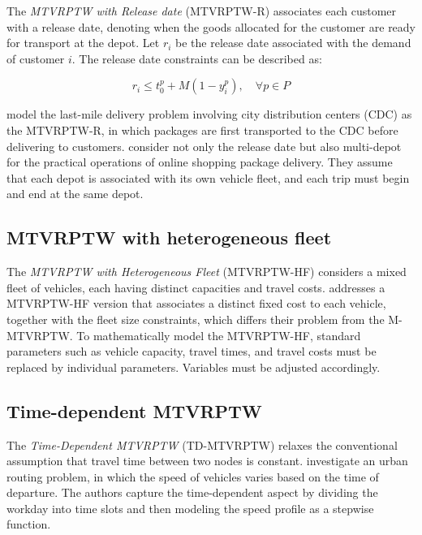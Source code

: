 \documentclass[11pt]{article}
\begin{document}
The \textit{MTVRPTW with Release date} (MTVRPTW-R) associates each customer with a release date, denoting when the goods allocated for the customer are ready for transport at the depot.  Let $r_i$ be the release date associated with the demand of customer $i$.  The release date constraints can be described as:

\begin{equation} \label{eq25}
    r_i \leq t^p_0 + M(1 - y^p_i), \quad \forall p \in P
\end{equation}

\cite{cattaruzza2016multi} model the last-mile delivery problem involving city distribution centers (CDC) as the MTVRPTW-R, in which packages are first transported to the CDC before delivering to customers.  \cite{zhen2020multi} consider not only the release date but also multi-depot for the practical operations of online shopping package delivery.  They assume that each depot is associated with its own vehicle fleet, and each trip must begin and end at the same depot.

\subsection{MTVRPTW with heterogeneous fleet}

The \textit{MTVRPTW with Heterogeneous Fleet} (MTVRPTW-HF) considers a mixed fleet of vehicles, each having distinct capacities and travel costs.  \cite{despaux2016multi} addresses a MTVRPTW-HF version that associates a distinct fixed cost to each vehicle, together with the fleet size constraints, which differs their problem from the M-MTVRPTW.  To mathematically model the MTVRPTW-HF, standard parameters such as vehicle capacity, travel times, and travel costs must be replaced by individual parameters.  Variables must be adjusted accordingly.

\subsection{Time-dependent MTVRPTW}

The \textit{Time-Dependent MTVRPTW} (TD-MTVRPTW) relaxes the conventional assumption that travel time between two nodes is constant.  \cite{pan2021multi} investigate an urban routing problem, in which the speed of vehicles varies based on the time of departure.  The authors capture the time-dependent aspect by dividing the workday into time slots and then modeling the speed profile as a stepwise function.
\end{document}
